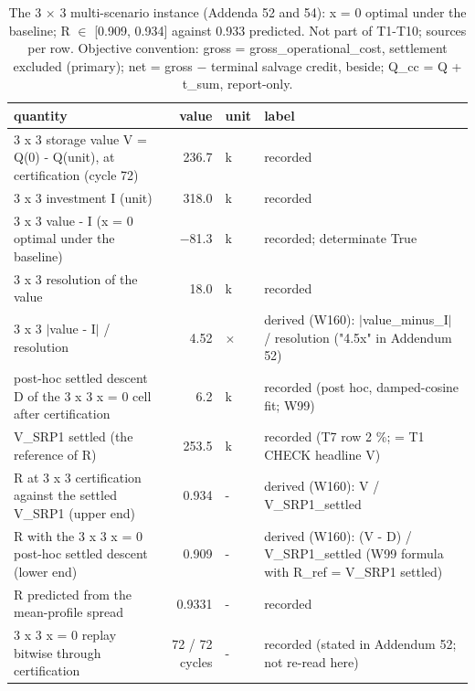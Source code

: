 \begin{table}[htbp]
\centering
\scriptsize
\caption{The 3 $\times$ 3 multi-scenario instance (Addenda 52 and 54): x = 0 optimal under the baseline; R $\in$ [0.909, 0.934] against 0.933 predicted. Not part of T1-T10; sources per row. Objective convention: gross = gross\_operational\_cost, settlement excluded (primary); net = gross $-$ terminal salvage credit, beside; Q\_cc = Q + t\_sum, report-only.}
\label{tab:T11}
\begin{tabular}{lrll}
\toprule
quantity & value & unit & label \\
\midrule
3 x 3 storage value V = Q(0) - Q(unit), at certification (cycle 72) & 236.7 & k\texteuro{} & recorded \\
3 x 3 investment I (unit) & 318.0 & k\texteuro{} & recorded \\
3 x 3 value - I (x = 0 optimal under the baseline) & $-$81.3 & k\texteuro{} & recorded; determinate True \\
3 x 3 resolution of the value & 18.0 & k\texteuro{} & recorded \\
3 x 3 $|$value - I$|$ / resolution & 4.52 & $\times$ & derived (W160): $|$value\_minus\_I$|$ / resolution ("4.5x" in Addendum 52) \\
post-hoc settled descent D of the 3 x 3 x = 0 cell after certification & 6.2 & k\texteuro{} & recorded (post hoc, damped-cosine fit; W99) \\
V\_SRP1 settled (the reference of R) & 253.5 & k\texteuro{} & recorded (T7 row 2 \%; = T1 CHECK headline V) \\
R at 3 x 3 certification against the settled V\_SRP1 (upper end) & 0.934 & - & derived (W160): V / V\_SRP1\_settled \\
R with the 3 x 3 x = 0 post-hoc settled descent (lower end) & 0.909 & - & derived (W160): (V - D) / V\_SRP1\_settled (W99 formula with R\_ref = V\_SRP1 settled) \\
R predicted from the mean-profile spread & 0.9331 & - & recorded \\
3 x 3 x = 0 replay bitwise through certification & 72 / 72 cycles & - & recorded (stated in Addendum 52; not re-read here) \\
\bottomrule
\end{tabular}
\end{table}
